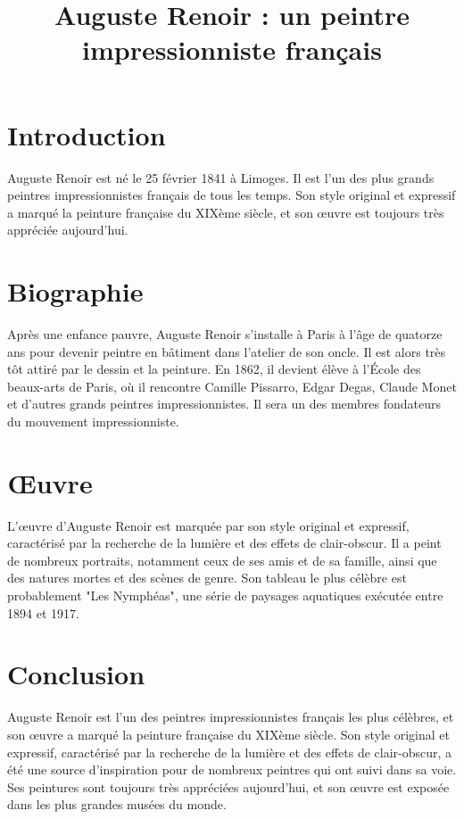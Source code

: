 \documentclass[12pt, a4paper]{article}
\title{Auguste Renoir : un peintre impressionniste français}
\author{}
\date{}
\begin{document}
\maketitle

\section{Introduction}
Auguste Renoir est né le 25 février 1841 à Limoges. Il est l'un des plus grands peintres impressionnistes français de tous les temps. Son style original et expressif a marqué la peinture française du XIXème siècle, et son œuvre est toujours très appréciée aujourd'hui.

\section{ Biographie }
Après une enfance pauvre, Auguste Renoir s'installe à Paris à l'âge de quatorze ans pour devenir peintre en bâtiment dans l'atelier de son oncle. Il est alors très tôt attiré par le dessin et la peinture. En 1862, il devient élève à l'École des beaux-arts de Paris, où il rencontre Camille Pissarro, Edgar Degas, Claude Monet et d'autres grands peintres impressionnistes. Il sera un des membres fondateurs du mouvement impressionniste.

\section{ Œuvre }
L'œuvre d'Auguste Renoir est marquée par son style original et expressif, caractérisé par la recherche de la lumière et des effets de clair-obscur. Il a peint de nombreux portraits, notamment ceux de ses amis et de sa famille, ainsi que des natures mortes et des scènes de genre. Son tableau le plus célèbre est probablement "Les Nymphéas", une série de paysages aquatiques exécutée entre 1894 et 1917.

\section{Conclusion }
Auguste Renoir est l'un des peintres impressionnistes français les plus célèbres, et son œuvre a marqué la peinture française du XIXème siècle. Son style original et expressif, caractérisé par la recherche de la lumière et des effets de clair-obscur, a été une source d'inspiration pour de nombreux peintres qui ont suivi dans sa voie. Ses peintures sont toujours très appréciées aujourd'hui, et son œuvre est exposée dans les plus grandes musées du monde.
\end{document}
